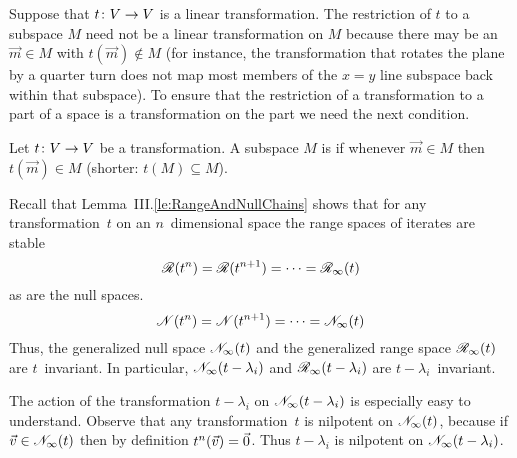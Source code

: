 Suppose that \( \mbox{$t\colon V\to V$} \) is a linear transformation.
The restriction %
of \( t \) to a subspace \( M \) need not be a linear transformation on \( M \)
because there may be an \( \vec{m}\in M \)
with \( t(\vec{m})\not\in M \) (for instance, the transformation 
that rotates the plane by
a quarter turn does not map most members of the $x=y$ line subspace back within
that subspace).
To ensure that the restriction of a transformation 
to a part of a space is a transformation on the part we need the next 
condition. 

\begin{definition} \label{def:invariant}
Let \( \mbox{$t\colon V\to V$} \) be a transformation.
A subspace \( M \) is %
if whenever \( \vec{m}\in M \) then \( t(\vec{m})\in M \)
(shorter: \( t(M)\subseteq M \)).
\end{definition}
 
Recall that Lemma~III.\ref{le:RangeAndNullChains} shows that for any
transformation~$t$ on an $n$~dimensional space
the range spaces of iterates are stable 
\begin{equation*}
  \mathscr{R}(t^n)=\mathscr{R}(t^{n+1})=\cdots=\mathscr{R}_\infty(t)
\end{equation*} 
as are the null spaces. 
\begin{equation*}
  \mathscr{N}(t^n)=\mathscr{N}(t^{n+1})=\cdots=\mathscr{N}_\infty(t)
\end{equation*} 
Thus,
the generalized null space $\mathscr{N}_\infty(t)$ and the generalized range space
$\mathscr{R}_\infty(t)$ are $t$~invariant.
In particular, 
$\mathscr{N}_\infty(t-\lambda_i)$ and $\mathscr{R}_\infty(t-\lambda_i)$
are $t-\lambda_i$~invariant.

The action of the transformation $t-\lambda_i$ on $\mathscr{N}_\infty(t-\lambda_i)$
is especially easy to understand.
Observe that any transformation~$t$ is nilpotent on $\mathscr{N}_\infty(t)$, 
because if $\vec{v}\in\mathscr{N}_\infty(t)$ then 
by definition $t^n(\vec{v})=\vec{0}$. 
Thus $t-\lambda_i$ is nilpotent on 
$\mathscr{N}_\infty(t-\lambda_i)$.

